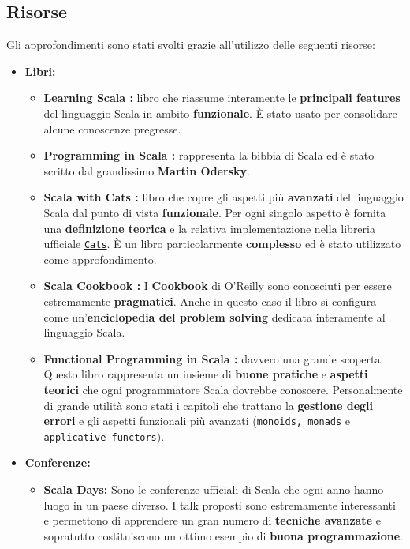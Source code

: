 \subsection{Risorse}
\label{subsubsec:risorse}
Gli approfondimenti sono stati svolti grazie all'utilizzo delle seguenti risorse:
\begin{itemize}
	\item{\textbf{Libri:}}
	\begin{itemize}
		\item{\textbf{Learning Scala \cite{scalaLearning:2014}:}} libro che riassume interamente le \textbf{principali features} del linguaggio Scala in ambito \textbf{funzionale}. È stato usato per consolidare alcune conoscenze pregresse.
		\item{\textbf{Programming in Scala \cite{scalaBook:2014}:}} rappresenta la bibbia di Scala ed è stato scritto dal grandissimo \textbf{Martin Odersky}.
		\item{\textbf{Scala with Cats \cite{scalaCats:2020}:}} libro che copre gli aspetti più \textbf{avanzati} del linguaggio Scala dal punto di vista \textbf{funzionale}. Per ogni singolo aspetto è fornita una \textbf{definizione teorica} e la relativa implementazione nella libreria ufficiale \href{https://typelevel.org/cats-effect/}{\texttt{Cats}}. È un libro particolarmente \textbf{complesso} ed è stato utilizzato come approfondimento.
		\item{\textbf{Scala Cookbook \cite{scalaCook:2013}:}} I \textbf{Cookbook} di O'Reilly sono conosciuti per essere estremamente \textbf{pragmatici}. Anche in questo caso il libro si configura come un'\textbf{enciclopedia del problem solving} dedicata interamente al linguaggio Scala.
		\item{\textbf{Functional Programming in Scala \cite{functionalScala:2014}:}} davvero una grande scoperta. Questo libro rappresenta un insieme di \textbf{buone pratiche} e \textbf{aspetti teorici} che ogni programmatore Scala dovrebbe conoscere. Personalmente di grande utilità sono stati i capitoli che trattano la \textbf{gestione degli errori} e gli aspetti funzionali più avanzati (\texttt{monoids, monads} e \texttt{applicative functors}).  
	\end{itemize}
	\item{\textbf{Conferenze:}}
	\begin{itemize}
		\item{\textbf{Scala Days:}}
		Sono le conferenze ufficiali di Scala che ogni anno hanno luogo in un paese diverso. I talk proposti sono estremamente interessanti e permettono di apprendere un gran numero di \textbf{tecniche avanzate} e sopratutto costituiscono un ottimo esempio di \textbf{buona programmazione}.

\end{itemize}
\end{itemize}
